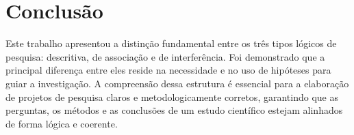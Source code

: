 \section{\esp Conclusão}


Este trabalho apresentou a distinção fundamental entre os três tipos lógicos de pesquisa: descritiva, de associação e de interferência. Foi demonstrado que a principal diferença entre eles reside na necessidade e no uso de hipóteses para guiar a investigação. A compreensão dessa estrutura é essencial para a elaboração de projetos de pesquisa claros e metodologicamente corretos, garantindo que as perguntas, os métodos e as conclusões de um estudo científico estejam alinhados de forma lógica e coerente.


